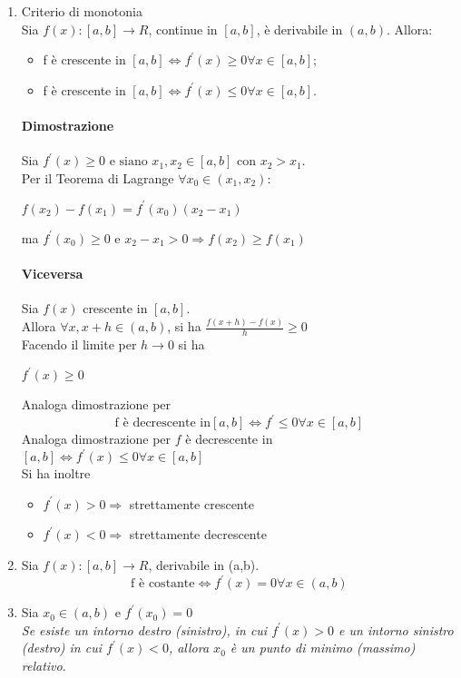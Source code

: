 \begin{enumerate}
	\item Criterio di monotonia\\
		Sia $f(x):[a,b]\to R$, continue in $[a,b]$, è derivabile in $(a,b)$.
		Allora:
		\begin{itemize}
			\item f è crescente in $[a,b]\Leftrightarrow f^\prime(x)\geq 0
				\forall x \in [a,b]$;
			\item f è crescente in $[a,b]\Leftrightarrow f^\prime(x)\leq 0
				\forall x \in [a,b]$.
		\end{itemize}
		\paragraph{Dimostrazione}
		Sia $f^\prime (x)\geq 0 \text{ e siano } x_1,x_2\in[a,b]\text{ con }
		x_2>x_1$.\\
		Per il Teorema di Lagrange $\forall x_0\in (x_1,x_2)$:	
			\begin{center}
				$f(x_2)-f(x_1)=f^\prime(x_0)(x_2-x_1)$
			\end{center}
			ma $f^\prime(x_0)\geq 0$ e $x_2-x_1>0 \Rightarrow f(x_2)\geq f(x_1)$
		\paragraph{Viceversa} Sia $f(x)$ crescente in $[a,b]$.\\
		Allora $\forall x, x+h\in (a,b)$, si ha $\frac{f(x+h)-f(x)}{h}\geq 0$\\
		Facendo il limite per $h\to 0$ si ha
		\begin{center}
			$f^\prime(x)\geq 0$
		\end{center}
		Analoga dimostrazione per
		\begin{equation}
			\text{f è decrescente in} [a,b]\Leftrightarrow f^\prime\leq 0 \forall
			x\in [a,b]
		\end{equation}
		Analoga dimostrazione per $f$ è decrescente in $[a,b]\Leftrightarrow
		f^\prime(x)\leq 0 \forall x \in [a,b]$\\
		Si ha inoltre
		\begin{itemize}
			\item $f^\prime (x)>0\Rightarrow$ strettamente crescente
			\item $f^\prime (x)<0\Rightarrow$ strettamente decrescente
		\end{itemize}
	\item Sia $f(x):[a,b]\to R$, derivabile in (a,b).
		\begin{equation}
			\text{f è costante} \Leftrightarrow f^\prime (x)=0 \forall x\in(a,b)
		\end{equation}		
	\item Sia $x_0\in (a,b)$ e $f^\prime (x_0)=0$\\
		\textit{Se esiste un intorno destro (sinistro), in cui $f^\prime (x)>0$
		e un intorno sinistro (destro) in cui $f^\prime (x)<0$, allora $x_0$ è
		un punto di minimo (massimo) relativo}.
\end{enumerate}
